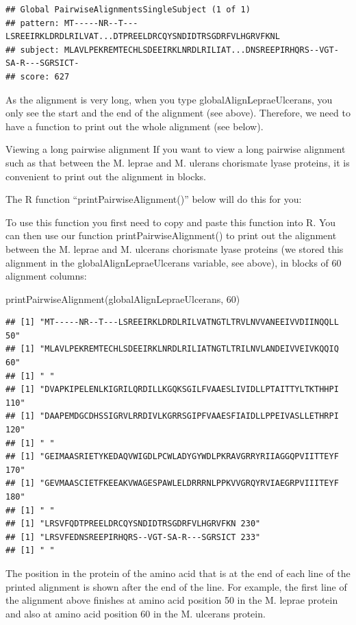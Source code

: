 \documentclass[
]{book}
\newenvironment{Shaded}{\begin{snugshade}}{\end{snugshade}}
\newcommand{\DecValTok}[1]{\textcolor[rgb]{0.00,0.00,0.81}{#1}}
\newcommand{\FunctionTok}[1]{\textcolor[rgb]{0.00,0.00,0.00}{#1}}
\newcommand{\NormalTok}[1]{#1}
\begin{document}
\begin{verbatim}
## Global PairwiseAlignmentsSingleSubject (1 of 1)
## pattern: MT-----NR--T---LSREEIRKLDRDLRILVAT...DTPREELDRCQYSNDIDTRSGDRFVLHGRVFKNL
## subject: MLAVLPEKREMTECHLSDEEIRKLNRDLRILIAT...DNSREEPIRHQRS--VGT-SA-R---SGRSICT-
## score: 627
\end{verbatim}

As the alignment is very long, when you type globalAlignLepraeUlcerans, you only see the start and the end of the alignment (see above). Therefore, we need to have a function to print out the whole alignment (see below).

Viewing a long pairwise alignment
If you want to view a long pairwise alignment such as that between the M. leprae and M. ulerans chorismate lyase proteins, it is convenient to print out the alignment in blocks.

The R function ``printPairwiseAlignment()'' below will do this for you:

To use this function you first need to copy and paste this function into R. You can then use our function printPairwiseAlignment() to print out the alignment between the M. leprae and M. ulcerans chorismate lyase proteins (we stored this alignment in the globalAlignLepraeUlcerans variable, see above), in blocks of 60 alignment columns:

\begin{Shaded}
\begin{Highlighting}[]
\FunctionTok{printPairwiseAlignment}\NormalTok{(globalAlignLepraeUlcerans, }\DecValTok{60}\NormalTok{)}
\end{Highlighting}
\end{Shaded}

\begin{verbatim}
## [1] "MT-----NR--T---LSREEIRKLDRDLRILVATNGTLTRVLNVVANEEIVVDIINQQLL 50"
## [1] "MLAVLPEKREMTECHLSDEEIRKLNRDLRILIATNGTLTRILNVLANDEIVVEIVKQQIQ 60"
## [1] " "
## [1] "DVAPKIPELENLKIGRILQRDILLKGQKSGILFVAAESLIVIDLLPTAITTYLTKTHHPI 110"
## [1] "DAAPEMDGCDHSSIGRVLRRDIVLKGRRSGIPFVAAESFIAIDLLPPEIVASLLETHRPI 120"
## [1] " "
## [1] "GEIMAASRIETYKEDAQVWIGDLPCWLADYGYWDLPKRAVGRRYRIIAGGQPVIITTEYF 170"
## [1] "GEVMAASCIETFKEEAKVWAGESPAWLELDRRRNLPPKVVGRQYRVIAEGRPVIIITEYF 180"
## [1] " "
## [1] "LRSVFQDTPREELDRCQYSNDIDTRSGDRFVLHGRVFKN 230"
## [1] "LRSVFEDNSREEPIRHQRS--VGT-SA-R---SGRSICT 233"
## [1] " "
\end{verbatim}

The position in the protein of the amino acid that is at the end of each line of the printed alignment is shown after the end of the line. For example, the first line of the alignment above finishes at amino acid position 50 in the M. leprae protein and also at amino acid position 60 in the M. ulcerans protein.
\end{document}
